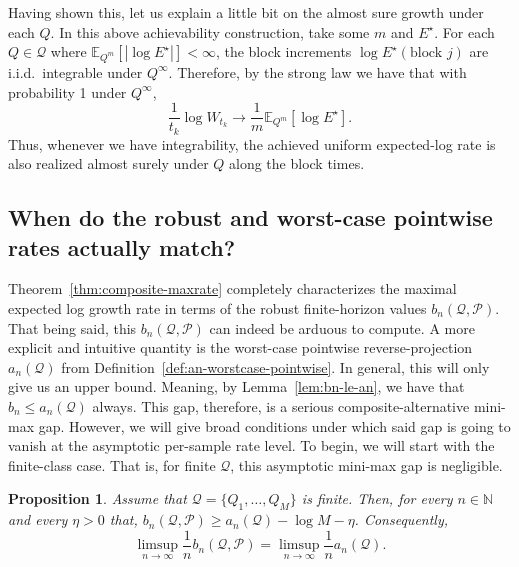 \documentclass[11pt]{article}
\newcommand{\E}{\mathbb{E}}
\newcommand{\Pcal}{\mathcal{P}}
\newcommand{\Qcal}{\mathcal{Q}}
\newtheorem{proposition}[theorem]{Proposition}
\theoremstyle{definition}
\theoremstyle{definition}
\begin{document}
Having shown this, let us explain a little bit on the almost sure growth under each $Q$. In this above achievability construction, take some $m$ and $E^\star$. For each $Q\in\Qcal$ where $\E_{Q^m}[|\log E^\star|]<\infty$, the block increments $\log E^\star(\text{block }j)$ are i.i.d.\ integrable under $Q^\infty$. Therefore, by the strong law we have that with probability 1 under $Q^\infty$,
\[
\frac{1}{t_k}\log W_{t_k} \longrightarrow \frac{1}{m}\E_{Q^m}[\log E^\star].
\]
Thus, whenever we have integrability, the achieved uniform expected-log rate is also realized almost surely under $Q$ along the block times.

\subsection{When do the robust and worst-case pointwise rates actually match?}
Theorem~\ref{thm:composite-maxrate} completely characterizes the maximal expected log growth rate in terms of the robust finite-horizon values $b_n(\Qcal,\Pcal)$. That being said, this $b_n(\Qcal,\Pcal)$ can indeed be arduous to compute. A more explicit and intuitive quantity is the worst-case pointwise reverse-projection $a_n(\Qcal)$ from Definition~\ref{def:an-worstcase-pointwise}. In general, this will only give us an upper bound. Meaning, by Lemma~\ref{lem:bn-le-an}, we have that $b_n\le a_n(\Qcal)$ always. This gap, therefore, is a serious composite-alternative mini-max gap. However, we will give broad conditions under which said gap is going to vanish at the asymptotic per-sample rate level. To begin, we will start with the finite-class case. That is, for finite $\Qcal$, this asymptotic mini-max gap is negligible.

\begin{proposition}\label{prop:finite-Q-gap}
Assume that $\Qcal=\{Q_1,\dots,Q_M\}$ is finite. Then, for every $n\in\mathbb N$ and every $\eta>0$ that, $b_n(\Qcal,\Pcal)\ge a_n(\Qcal)-\log M-\eta$. Consequently,
\[
\limsup_{n\to\infty}\frac{1}{n}b_n(\Qcal,\Pcal) = \limsup_{n\to\infty}\frac{1}{n}a_n(\Qcal).
\]
\end{proposition}
\end{document}
